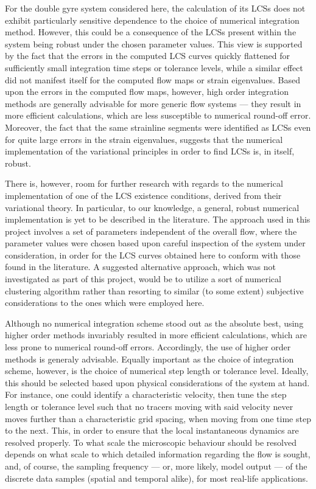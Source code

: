 For the double gyre system considered here, the calculation of its LCSs
does not exhibit particularly sensitive dependence to
the choice of numerical integration method. However, this could be a
consequence of the LCSs present within the system being robust under the chosen
parameter values. This view is supported by the fact that the errors in the
computed LCS curves quickly flattened for sufficiently small integration time
steps or tolerance levels, while a similar effect did not manifest itself for
the computed flow maps or strain eigenvalues. Based upon the errors in the
computed flow maps, however, high order integration methods are generally
advisable for more generic flow systems --- they result in more efficient
calculations, which are less susceptible to numerical round-off error.
Moreover, the fact that the same strainline segments were identified as LCSs
even for quite large errors in the strain eigenvalues, suggests that the
numerical implementation of the variational principles in order to find LCSs is,
in itself, robust.

There is, however, room for further research with regards to the numerical
implementation of one of the LCS existence conditions, derived from their
variational theory. In particular, to our knowledge, a general, robust numerical
implementation is yet to be described in the literature. The approach used
in this project involves a set of parameters independent of the overall flow,
where the parameter values were chosen based upon careful inspection of the
system under consideration, in order for the LCS curves obtained here to
conform with those found in the literature. A suggested alternative approach,
which was not investigated as part of this project, would be to utilize a sort
of numerical clustering algorithm rather than resorting to similar
(to some extent) subjective considerations to the ones which were employed here.

Although no numerical integration scheme stood out as the absolute best,
using higher order methods invariably resulted in more efficient calculations,
which are less prone to numerical round-off errors. Accordingly, the use of
higher order methods is generaly advisable. Equally important as the choice of
integration scheme, however, is the choice of numerical step length or tolerance
level. Ideally, this should be selected based upon physical considerations of
the system at hand. For instance, one could identify a characteristic velocity,
then tune the step length or tolerance level such that no tracers moving with
said velocity never moves further than a characteristic grid spacing, when
moving from one time step to the next. This, in order to ensure that the local
instantaneous dynamics are resolved properly. To what scale the microscopic
behaviour should be resolved depends on what scale to which detailed information
regarding the flow is sought, and, of course, the sampling frequency --- or,
more likely, model output --- of the discrete data samples (spatial and
temporal alike), for most real-life applications.

